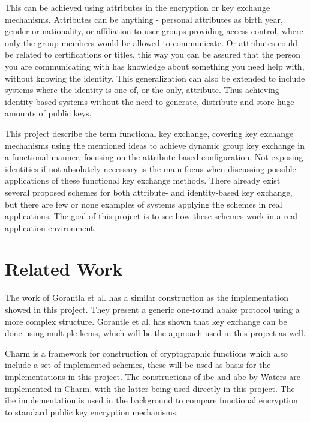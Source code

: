  \par This can be achieved using attributes in the encryption or key exchange mechanisms. Attributes can be anything - personal attributes as birth year, gender or nationality, or affiliation to user groups providing access control, where only the group members would be allowed to communicate. Or attributes could be related to certifications or titles, this way you can be assured that the person you are communicating with has knowledge about something you need help with, without knowing the identity. This generalization can also be extended to include systems where the identity is one of, or the only, attribute. Thus achieving identity based systems without the need to generate, distribute and store huge amounts of public keys. 
\par This project describe the term functional key exchange, covering key exchange mechanisms using the mentioned ideas to achieve dynamic group key exchange in a functional manner, focusing on the attribute-based configuration. Not exposing identities if not absolutely necessary is the main focus when discussing possible applications of these functional key exchange methods. There already exist several proposed schemes for both attribute- and identity-based key exchange, but there are few or none examples of systems applying the schemes in real applications. The goal of this project is to see how these schemes work in a real application environment.

\section{Related Work}\label{sec:related_work}
The work of Gorantla et al.\cite{gorantla2010attribute} has a similar construction as the implementation showed in this project. They present a generic one-round \gls{abake} protocol using a more complex structure. Gorantle et al. \cite{kem-group-ke} has shown that key exchange can be done using multiple \glspl{kem}, which will be the approach used in this project as well.
\par Charm \cite{DBLP:Charm13} is a framework for construction of cryptographic functions which also include a set of implemented schemes, these will be used as basis for the implementations in this project. The constructions of \gls{ibe} and \gls{abe} by Waters \cite{ibe_waters09, abe_waters09} are implemented in Charm, with the latter being used directly in this project. The \gls{ibe} implementation is used in the background to compare functional encryption to standard public key encryption mechanisms.

